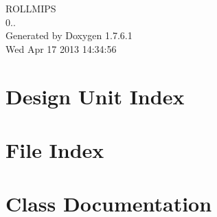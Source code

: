 \documentclass[a4paper]{book}
\begin{document}
\hypersetup{pageanchor=false,citecolor=blue}
\begin{titlepage}
\vspace*{7cm}
\begin{center}
{\Large \-R\-O\-L\-L\-M\-I\-P\-S \\[1ex]\large 0.. }\\
\vspace*{1cm}
{\large \-Generated by Doxygen 1.7.6.1}\\
\vspace*{0.5cm}
{\small Wed Apr 17 2013 14:34:56}\\
\end{center}
\end{titlepage}
\clearemptydoublepage
{}
\tableofcontents
\clearemptydoublepage
{}
\hypersetup{pageanchor=true,citecolor=blue}
\chapter{\-Design \-Unit \-Index}

\chapter{\-File \-Index}

\chapter{\-Class \-Documentation}














































\end{document}

